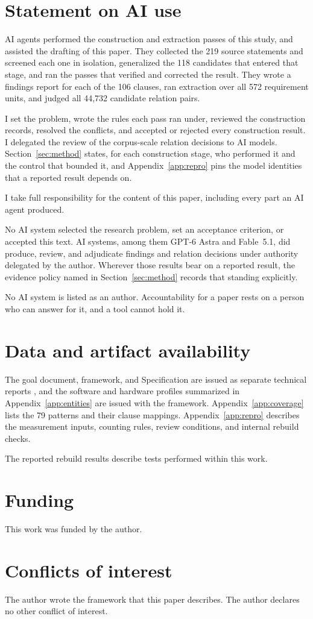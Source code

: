 \section*{Statement on AI use}

AI agents performed the construction and extraction passes of this study, and assisted the drafting of this paper. They collected the 219 source statements and screened each one in isolation, generalized the 118 candidates that entered that stage, and ran the passes that verified and corrected the result. They wrote a findings report for each of the 106 clauses, ran extraction over all 572 requirement units, and judged all 44{,}732 candidate relation pairs.

I set the problem, wrote the rules each pass ran under, reviewed the construction records, resolved the conflicts, and accepted or rejected every construction result. I delegated the review of the corpus-scale relation decisions to AI models. Section~\ref{sec:method} states, for each construction stage, who performed it and the control that bounded it, and Appendix~\ref{app:repro} pins the model identities that a reported result depends on.

I take full responsibility for the content of this paper, including every part an AI agent produced.

No AI system selected the research problem, set an acceptance criterion, or accepted this text. AI systems, among them GPT-6 Astra and Fable~5.1, did produce, review, and adjudicate findings and relation decisions under authority delegated by the author. Wherever those results bear on a reported result, the evidence policy named in Section~\ref{sec:method} records that standing explicitly.

No AI system is listed as an author. Accountability for a paper rests on a person who can answer for it, and a tool cannot hold it.

\section*{Data and artifact availability}

The goal document, framework, and Specification are issued as separate technical reports \citep{goal2026,tbf2026,pss2026}, and the software and hardware profiles summarized in Appendix~\ref{app:entities} are issued with the framework. Appendix~\ref{app:coverage} lists the 79 patterns and their clause mappings. Appendix~\ref{app:repro} describes the measurement inputs, counting rules, review conditions, and internal rebuild checks.

The reported rebuild results describe tests performed within this work.

\section*{Funding}

This work was funded by the author.

\section*{Conflicts of interest}

The author wrote the framework that this paper describes. The author declares no other conflict of interest.

